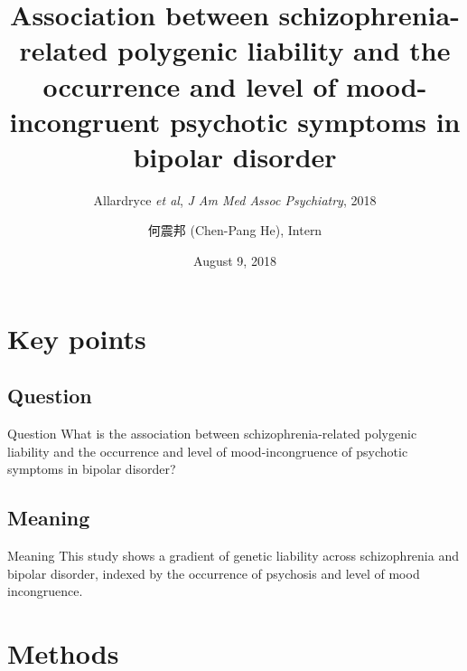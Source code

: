 \documentclass{beamer}
\title[(Allardyce \textit{et al}, 2018)]{Association between schizophrenia-related polygenic liability and the occurrence and level of mood-incongruent psychotic symptoms in bipolar disorder}
\subtitle{Allardryce \textit{et al}, \textit{J Am Med Assoc Psychiatry}, 2018}
\author[Chen-Pang He]{何震邦 (Chen-Pang He), Intern}
\date{August 9, 2018}
\institute[CGH]{Cathay General Hospital}
\begin{document}
\maketitle

\section{Key points}
\subsection{Question}
\begin{frame}{Question}
    What is the association between schizophrenia-related polygenic liability
    and the occurrence and level of mood-incongruence of psychotic symptoms in
    bipolar disorder?
\end{frame}

\subsection{Meaning}
\begin{frame}{Meaning}
    This study shows a gradient of genetic liability across schizophrenia and
    bipolar disorder, indexed by the occurrence of psychosis and level of mood
    incongruence.
\end{frame}

\section{Methods}
\end{document}
